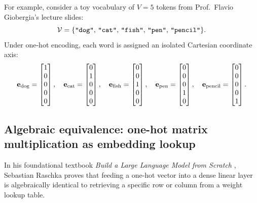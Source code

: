 \documentclass[../../main.tex]{subfiles}
\begin{document}
For example, consider a toy vocabulary of $V=5$ tokens from Prof.~Flavio Giobergia's lecture slides:
\begin{equation}
\label{eq:toy_vocab}
\mathcal{V} = \{\text{\texttt{"dog"}}, \, \text{\texttt{"cat"}}, \, \text{\texttt{"fish"}}, \, \text{\texttt{"pen"}}, \, \text{\texttt{"pencil"}}\}.
\end{equation}
Under one-hot encoding, each word is assigned an isolated Cartesian coordinate axis:
\begin{equation}
\label{eq:toy_onehots}
\mathbf{e}_{\text{dog}} = \begin{bmatrix} 1 \\ 0 \\ 0 \\ 0 \\ 0 \end{bmatrix}, \quad
\mathbf{e}_{\text{cat}} = \begin{bmatrix} 0 \\ 1 \\ 0 \\ 0 \\ 0 \end{bmatrix}, \quad
\mathbf{e}_{\text{fish}} = \begin{bmatrix} 0 \\ 0 \\ 1 \\ 0 \\ 0 \end{bmatrix}, \quad
\mathbf{e}_{\text{pen}} = \begin{bmatrix} 0 \\ 0 \\ 0 \\ 1 \\ 0 \end{bmatrix}, \quad
\mathbf{e}_{\text{pencil}} = \begin{bmatrix} 0 \\ 0 \\ 0 \\ 0 \\ 1 \end{bmatrix}.
\end{equation}

\subsection{Algebraic equivalence: one-hot matrix multiplication as embedding lookup}
\label{subsec:onehot_lookup_proof}

In his foundational textbook \emph{Build a Large Language Model from Scratch} \cite{raschka2024llm}, Sebastian Raschka proves that feeding a one-hot vector into a dense linear layer is algebraically identical to retrieving a specific row or column from a weight lookup table.
\end{document}
